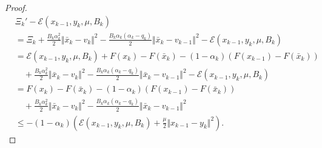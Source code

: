 \documentclass[12pt]{article}
\begin{document}
\begin{proof}
            \begin{align*}
                & \Xi_k' - \mathcal E(x_{k - 1}, y_k, \mu, B_k) 
                \\
                &= 
                \Xi_k 
                + \frac{B_k\alpha_k^2}{2}\Vert \bar x_k - v_k\Vert^2 
                - \frac{B_k\alpha_k(\alpha_k - q_k)}{2}\Vert \bar x_k - v_{k - 1}\Vert^2
                - \mathcal E(x_{k - 1}, y_k, \mu, B_k) 
                \\
                &= \mathcal E(x_{k - 1}, y_k, \mu, B_k)
                + F(x_k) - F(\bar x_k)
                - (1 - \alpha_k)(F(x_{k - 1}) - F(\bar x_k))
                    \\ &\quad 
                    + \frac{B_k\alpha_k^2}{2}\Vert \bar x_k - v_k\Vert^2 
                    - \frac{B_k\alpha_k(\alpha_k - q_k)}{2}\Vert \bar x_k - v_{k - 1}\Vert^2
                    - \mathcal E(x_{k - 1}, y_k, \mu, B_k)
                \\
                &=  
                F(x_k) - F(\bar x_k)
                - (1 - \alpha_k)(F(x_{k - 1}) - F(\bar x_k))
                    \\ &\quad 
                    + \frac{B_k\alpha_k^2}{2}\Vert \bar x_k - v_k\Vert^2 
                    - \frac{B_k\alpha_k(\alpha_k - q_k)}{2}\Vert \bar x_k - v_{k - 1}\Vert^2
                \\
                &\le -(1 - \alpha_k)\left(
                    \mathcal E(x_{k - 1}, y_k, \mu, B_k)
                    + \frac{\mu}{2}\Vert x_{k - 1} - y_k\Vert^2
                \right). 
            \end{align*}
        \end{proof}
\end{document}
